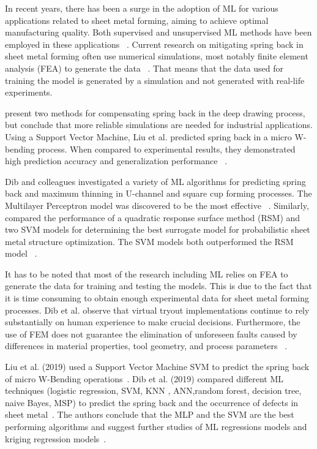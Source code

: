In recent years, there has been a surge in the adoption of \ac{ML} for various applications related to sheet metal
forming, aiming to achieve optimal manufacturing quality.
Both supervised and unsupervised \ac{ML} methods have been employed in these applications
~\cite[p. 2]{cruz_applicationmachinelearning_2021}.
Current research on mitigating spring back in sheet metal forming often use numerical simulations, most notably
finite element analysis (FEA) to generate the data
~\cite[p. 566]{liu2021deep}.
That means that the data used for training the model is generated by a simulation and not generated with real-life
experiments.

\cite{lingbeek2005development} present two methods for compensating spring back in the deep
drawing process, but conclude that more reliable simulations are needed for industrial applications.
Using a Support Vector Machine, Liu et al. predicted spring back in a micro W-bending process.
When compared to experimental results, they demonstrated high prediction accuracy and generalization performance
~\cite[p. 1]{liu_springbackpredictionforming_2019}.

Dib and colleagues investigated a variety of \ac{ML} algorithms for predicting spring back and maximum thinning in
U-channel and square cup forming processes.
The Multilayer Perceptron model was discovered to be the most effective
~\cite{dib_singleensembleclassifiers_2020}.
Similarly, \cite{abdessalem2015probabilistic} compared the performance of a quadratic response surface method (RSM)
and two \ac{SVM} models for determining the best surrogate model for probabilistic sheet metal structure optimization.
The \ac{SVM} models both outperformed the RSM model
~\cite[]{abdessalem2015probabilistic}.

It has to be noted that most of the research including \ac{ML} relies on FEA to generate the data for training and
testing the models.
This is due to the fact that it is time consuming to obtain enough experimental data for
sheet metal forming processes.
Dib et al. observe that virtual tryout implementations continue to rely substantially on human experience to make
crucial decisions.
Furthermore, the use of FEM does not guarantee the elimination of unforeseen faults caused by differences in material
properties, tool geometry, and process parameters
~\cite[p. 2]{dib_singleensembleclassifiers_2020}.

Liu et al. (2019) used a Support Vector Machine \ac{SVM} to predict the spring back of
micro W-Bending operations~\cite{liu_springbackpredictionforming_2019}.
Dib et al. (2019) compared different \ac{ML} techniques (logistic regression, SVM, KNN
, ANN,random forest, decision tree, naive Bayes, MSP) to predict the spring back and the occurrence of
defects in sheet metal~\cite[p. 1]{dib_singleensembleclassifiers_2020}.
The authors conclude that the MLP and the SVM are the best performing algorithms and
suggest further studies of ML regressions models and kriging regression
models~\cite[p. 13]{dib_singleensembleclassifiers_2020}.

